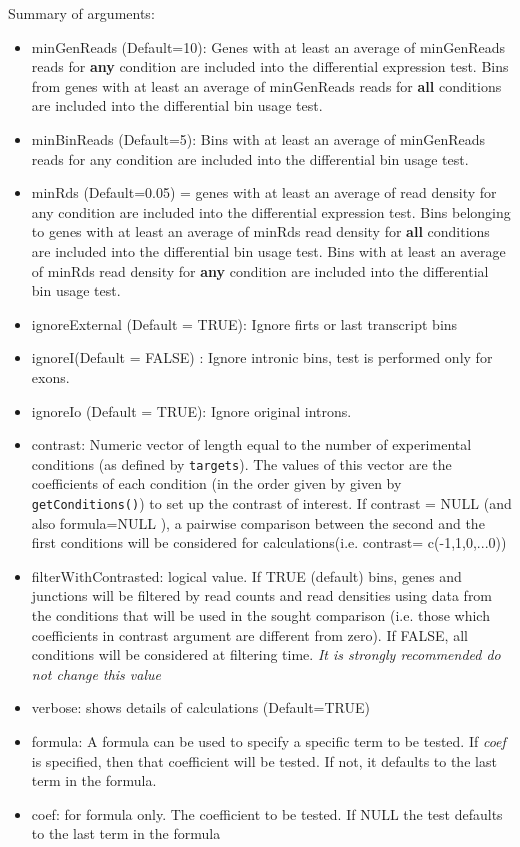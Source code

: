 \documentclass{article}
\begin{document}
Summary of arguments:
\begin{itemize}
\item minGenReads (Default=10): Genes with at least an average of minGenReads reads for \textbf{any} condition are included into the differential expression test. Bins from genes with at least an average of minGenReads reads for \textbf{all} conditions are included into the differential bin usage test. 
\item minBinReads (Default=5): Bins with at least an average of minGenReads reads  for any condition are included into the differential bin usage test. 
\item minRds (Default=0.05) = genes with at least an average of read density for any condition are included into the differential expression test. Bins belonging to genes with at least an average of minRds read density for \textbf{all} conditions are included into the differential bin usage test. Bins with at least an average of minRds read density for \textbf{any} condition are included into the differential bin usage test. 
\item ignoreExternal (Default = TRUE): Ignore firts or last transcript bins 
\item ignoreI(Default = FALSE) : Ignore intronic bins, test is performed only for exons. 
\item ignoreIo (Default = TRUE): Ignore original introns. 
\item contrast: Numeric vector of length equal to the number of experimental conditions (as defined by \texttt{targets}). The values of this vector are the coefficients of each condition  (in the order given by given by \texttt{getConditions()}) to set up the contrast of interest.  If contrast = NULL (and also formula=NULL ), a pairwise comparison between the second and the first conditions will be considered for calculations(i.e. contrast= c(-1,1,0,...0))
\item filterWithContrasted: logical value. If TRUE (default) bins, genes and junctions will be filtered by read counts and read densities using data from the conditions that will be used in the sought comparison (i.e. those which coefficients in contrast argument are different from zero). If FALSE, all conditions will be considered at filtering time. \textit{It is strongly recommended do not change this value}
\item verbose:  shows details of calculations (Default=TRUE)
\item  formula: A formula can be used to specify a specific term to be tested. If {\em coef} is specified, then that coefficient will be tested. If not, it defaults to the last term in the formula.
\item coef: for formula only. The coefficient to be tested. If NULL the test defaults to the last term in the formula
\end{itemize}
\end{document}
